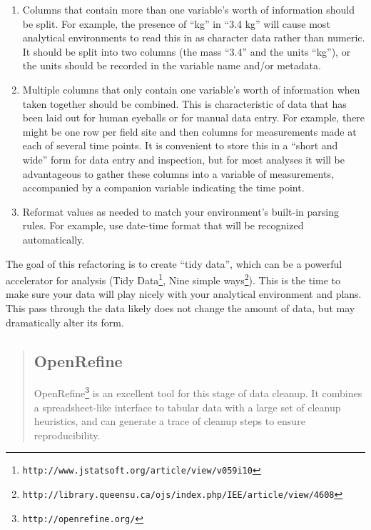 \documentclass[10pt]{article}
\newcommand{\withurl}[2]{{#1}\footnote{\texttt{#2}}}
\begin{document}
\begin{enumerate}
\item
  Columns that contain more than one variable's worth of information
  should be split. For example, the presence of ``kg'' in ``3.4 kg''
  will cause most analytical environments to read this in as character
  data rather than numeric. It should be split into two columns (the
  mass ``3.4'' and the units ``kg''), or the units should be recorded in
  the variable name and/or metadata.
\item
  Multiple columns that only contain one variable's worth of information
  when taken together should be combined. This is characteristic of data
  that has been laid out for human eyeballs or for manual data entry.
  For example, there might be one row per field site and then columns
  for measurements made at each of several time points. It is convenient
  to store this in a ``short and wide'' form for data entry and
  inspection, but for most analyses it will be advantageous to gather
  these columns into a variable of measurements, accompanied by a
  companion variable indicating the time point.
\item
  Reformat values as needed to match your environment's built-in parsing
  rules. For example, use date-time format that will be recognized
  automatically.
\end{enumerate}

The goal of this refactoring is to create ``tidy data'', which can be
a powerful accelerator for analysis (\withurl{Tidy
  Data}{http://www.jstatsoft.org/article/view/v059i10}, \withurl{Nine
  simple
  ways}{http://library.queensu.ca/ojs/index.php/IEE/article/view/4608}). This
is the time to make sure your data will play nicely with your
analytical environment and plans. This pass through the data likely
does not change the amount of data, but may dramatically alter its
form.

\begin{quote}
\subsection*{OpenRefine}

\withurl{OpenRefine}{http://openrefine.org/} is an excellent tool for
this stage of data cleanup. It combines a spreadsheet-like interface
to tabular data with a large set of cleanup heuristics, and can
generate a trace of cleanup steps to ensure reproducibility.
\end{quote}
\end{document}
